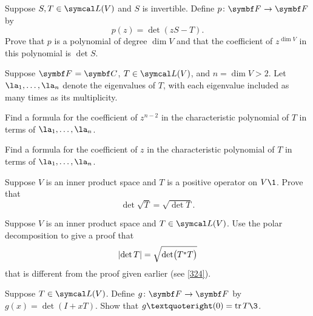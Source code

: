 \begin{exercises}
\exercise
Suppose $S, T \in \L(V)$ and $S$ is invertible. Define $\fun p {\F{}} {\F{}}$ by
\[
p(z) = \det(zS - T).
\]
Prove that $p$ is a polynomial of degree $\dim V$ and that the coefficient of $z^{\dim V}$ in this polynomial is $\det S$.


\exercise
Suppose $\F{} = \C{}$, $T \in \L(V)$, and $n = \dim V > 2$. Let $\la_1, \ldots, \la_n$ denote the eigenvalues of $T$, with each eigenvalue included as many times as its multiplicity.
\begin{subtheorem}
\item
Find a formula for the coefficient of $z^{n-2}$ in the characteristic polynomial of $T$ in terms of
$\la_1, \ldots, \la_n$.
\item
Find a formula for the coefficient of $z$ in the characteristic polynomial of $T$ in terms of
$\la_1, \ldots, \la_n$.
\end{subtheorem}
\exercisesubtheoremend


\exercise
Suppose $V$ is an inner product space and $T$ is a positive operator on $V\1$. Prove that\label{9detsq}
\[
\det \sqrt{T} = \sqrt{ \det T }.
\]
\exercisedisplayend


\exercise
Suppose $V$ is an inner product space and $T \in \L(V)$. Use the polar decomposition to give a proof that
\[
\abs{\det T} = \sqrt{\det\paren[\big]{T^*T}}
\]
that is different from the proof given earlier (see \ref{324}).


\exercise
Suppose $T \in \L(V)$. Define $\fun g {\F{}} {\F{}}$ by
$
g(x) = \det(I + xT)$.
Show that $g’(0) = \tr T\3$.

\end{exercises}
